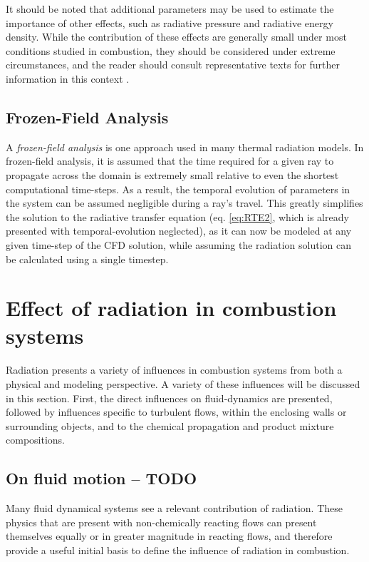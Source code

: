 It should be noted that additional parameters may be used to estimate the importance of other effects, such as radiative pressure and radiative energy density.
While the contribution of these effects are generally small under most conditions studied in combustion, they should be considered under extreme circumstances, and the reader should consult representative texts for further information in this context \cite{Pai1966RadiationDynamics}.

\subsection{Frozen-Field Analysis}
A \textit{frozen-field analysis} is one approach used in many thermal radiation models. In frozen-field analysis, it is assumed that the time required for a given ray to propagate across the domain is extremely small relative to even the shortest computational time-steps. 
As a result, the temporal evolution of parameters in the system can be assumed negligible during a ray's travel.
This greatly simplifies the solution to the radiative transfer equation (eq. \ref{eq:RTE2}, which is already presented with temporal-evolution neglected), as it can now be modeled at any given time-step of the CFD solution, while assuming the radiation solution can be calculated using a single timestep.

\section{Effect of radiation in combustion systems}
Radiation presents a variety of influences in combustion systems from both a physical and modeling perspective. A variety of these influences will be discussed in this section. First, the direct influences on fluid-dynamics are presented, followed by influences specific to turbulent flows, within the enclosing walls or surrounding objects, and to the chemical propagation and product mixture compositions.

\subsection{On fluid motion – TODO}
Many fluid dynamical systems see a relevant contribution of radiation. These physics that are present with non-chemically reacting flows can present themselves equally or in greater magnitude in reacting flows, and therefore provide a useful initial basis to define the influence of radiation in combustion. 

